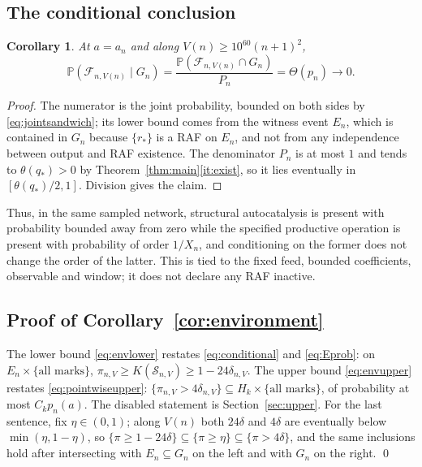 \documentclass[11pt,letterpaper]{article}
\theoremstyle{plain}
\newtheorem{corollary}[theorem]{Corollary}
\theoremstyle{definition}
\theoremstyle{remark}
\numberwithin{equation}{section}
\newcommand{\PP}{\mathbb P}
\newcommand{\cF}{\mathcal F}
\newcommand{\cS}{\mathcal S}
\newcommand{\thetaq}{\theta(q_*)}
\begin{document}
\subsection{The conditional conclusion}\label{sec:conditional}
\begin{corollary}\label{cor:conditional}
At $a=a_n$ and along $V(n)\ge10^{60}(n+1)^2$,
\[
 \PP(\cF_{n,V(n)}\mid G_n)=\frac{\PP(\cF_{n,V(n)}\cap G_n)}{P_n}=\Theta(p_n)\longrightarrow0 .
\]
\end{corollary}
\begin{proof}
The numerator is the joint probability, bounded on both sides by \eqref{eq:jointsandwich}; its lower bound comes from the witness event $E_n$, which is contained in $G_n$ because $\{r_*\}$ is a RAF on $E_n$, and not from any independence between output and RAF existence. The denominator $P_n$ is at most $1$ and tends to $\thetaq>0$ by Theorem~\ref{thm:main}\ref{it:exist}, so it lies eventually in $[\thetaq/2,1]$. Division gives the claim.
\end{proof}
Thus, in the same sampled network, structural autocatalysis is present with probability bounded away from zero while the specified productive operation is present with probability of order $1/X_n$, and conditioning on the former does not change the order of the latter. This is tied to the fixed feed, bounded coefficients, observable and window; it does not declare any RAF inactive.

\subsection{Proof of Corollary~\texorpdfstring{\ref{cor:environment}}{3.3}}\label{sec:envproof}
The lower bound \eqref{eq:envlower} restates \eqref{eq:conditional} and \eqref{eq:Eprob}: on $E_n\times\{\text{all marks}\}$, $\pi_{n,V}\ge K(\cS_{n,V})\ge1-24\delta_{n,V}$. The upper bound \eqref{eq:envupper} restates \eqref{eq:pointwiseupper}: $\{\pi_{n,V}>4\delta_{n,V}\}\subseteq H_k\times\{\text{all marks}\}$, of probability at most $C_kp_n(a)$. The disabled statement is Section~\ref{sec:upper}. For the last sentence, fix $\eta\in(0,1)$; along $V(n)$ both $24\delta$ and $4\delta$ are eventually below $\min(\eta,1-\eta)$, so $\{\pi\ge1-24\delta\}\subseteq\{\pi\ge\eta\}\subseteq\{\pi>4\delta\}$, and the same inclusions hold after intersecting with $E_n\subseteq G_n$ on the left and with $G_n$ on the right. \qed
\end{document}
